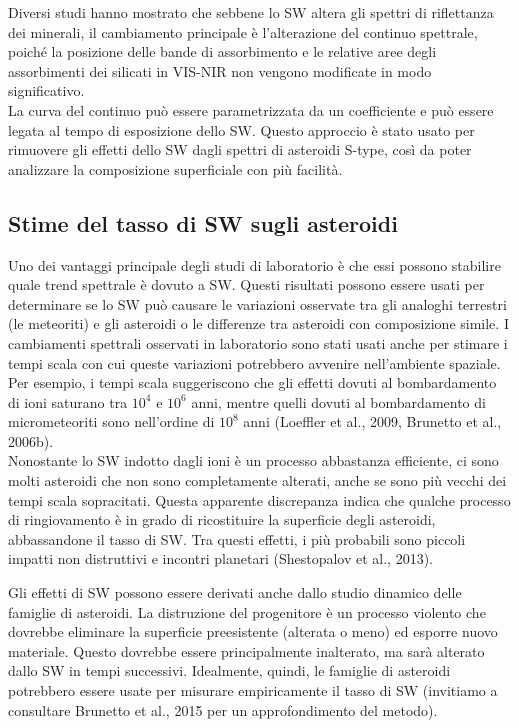 \documentclass[a4paper,11pt,openright]{book}
\begin{document}
Diversi studi hanno mostrato che sebbene lo SW altera gli spettri di riflettanza dei minerali, il cambiamento principale è l'alterazione del continuo spettrale, poiché la posizione delle bande di assorbimento e le relative aree degli assorbimenti dei silicati in VIS-NIR non vengono modificate in modo significativo.\\
La curva del continuo può essere parametrizzata da un coefficiente e può essere legata al tempo di esposizione dello SW. Questo approccio è stato usato per rimuovere gli effetti dello SW dagli spettri di asteroidi S-type, così da poter analizzare la composizione superficiale con più facilità.

\subsection{Stime del tasso di SW sugli asteroidi}
Uno dei vantaggi principale degli studi di laboratorio è che essi possono stabilire quale trend spettrale è dovuto a SW. Questi risultati possono essere usati per determinare se lo SW può causare le variazioni osservate tra gli analoghi terrestri (le meteoriti) e gli asteroidi o le differenze tra asteroidi con composizione simile. I cambiamenti spettrali osservati in laboratorio sono stati usati anche per stimare i tempi scala con cui queste variazioni potrebbero avvenire nell'ambiente spaziale. Per esempio, i tempi scala suggeriscono che gli effetti dovuti al bombardamento di ioni saturano tra $10^4$ e $10^6$ anni, mentre quelli dovuti al bombardamento di micrometeoriti sono nell'ordine di $10^8$ anni (Loeffler et al., 2009, Brunetto et al., 2006b).\\
Nonostante lo SW indotto dagli ioni è un processo abbastanza efficiente, ci sono molti asteroidi che non sono completamente alterati, anche se sono più vecchi dei tempi scala sopracitati. Questa apparente discrepanza indica che qualche processo di ringiovamento è in grado di ricostituire la superficie degli asteroidi, abbassandone il tasso di SW. Tra questi effetti, i più probabili sono piccoli impatti non distruttivi e incontri planetari (Shestopalov et al., 2013).

Gli effetti di SW possono essere derivati anche dallo studio dinamico delle famiglie di asteroidi. La distruzione del progenitore è un processo violento che dovrebbe eliminare la superficie preesistente (alterata o meno) ed esporre nuovo materiale. Questo dovrebbe essere principalmente inalterato, ma sarà alterato dallo SW in tempi successivi. Idealmente, quindi, le famiglie di asteroidi potrebbero essere usate per misurare empiricamente il tasso di SW (invitiamo a consultare Brunetto et al., 2015 per un approfondimento del metodo).
\end{document}
